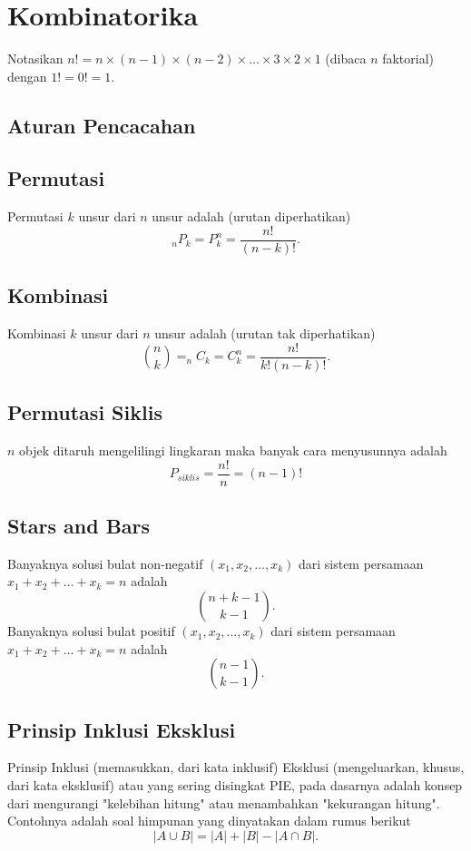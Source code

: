 \section{Kombinatorika}
Notasikan $n!=n \times (n-1) \times (n-2) \times \dots \times 3 \times 2 \times 1$ (dibaca $n$ faktorial) dengan $1!=0!=1$.
\subsection{Aturan Pencacahan}

\subsection{Permutasi}
Permutasi $k$ unsur dari $n$ unsur adalah (urutan diperhatikan)
$$_nP_k = P_k^n = \dfrac{n!}{(n-k)!}.$$

\subsection{Kombinasi}
Kombinasi $k$ unsur dari $n$ unsur adalah (urutan tak diperhatikan)
$${n \choose k}=_nC_k = C_k^n = \dfrac{n!}{k!(n-k)!}.$$

\subsection{Permutasi Siklis}
$n$ objek ditaruh mengelilingi lingkaran maka banyak cara menyusunnya adalah
$$P_{siklis} =\dfrac{n!}{n} = (n-1)!$$

\subsection{Stars and Bars}
Banyaknya solusi bulat non-negatif $(x_1,x_2,\dots,x_k)$ dari sistem persamaan $x_1+x_2+\dots+x_k=n$ adalah
$${n+k-1 \choose k-1}.$$
Banyaknya solusi bulat positif $(x_1,x_2,\dots,x_k)$ dari sistem persamaan $x_1+x_2+\dots+x_k=n$ adalah
$${n-1 \choose k-1}.$$

\subsection{Prinsip Inklusi Eksklusi}
Prinsip Inklusi (memasukkan, dari kata inklusif) Eksklusi (mengeluarkan, khusus, dari kata eksklusif) atau yang sering disingkat PIE, pada dasarnya adalah konsep dari mengurangi "kelebihan hitung" atau menambahkan "kekurangan hitung". Contohnya adalah soal himpunan yang dinyatakan dalam rumus berikut
$$|A \cup B|=|A|+|B|-|A \cap B|.$$


